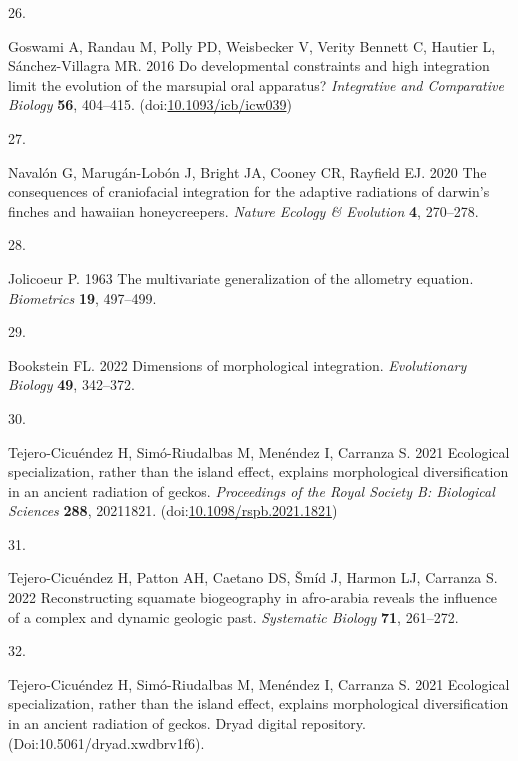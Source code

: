 \documentclass[
  11pt,
]{article}
\newlength{\cslhangindent}
\newlength{\csllabelwidth}
\newlength{\cslentryspacingunit} %
\newenvironment{CSLReferences}[2] %
 {%
  \setlength{\parindent}{0pt}
  \ifodd #1
  \let\oldpar\par
  \def\par{\hangindent=\cslhangindent\oldpar}
  \fi
  \setlength{\parskip}{#2\cslentryspacingunit}
 }%
 {}
\newcommand{\CSLLeftMargin}[1]{\parbox[t]{\csllabelwidth}{#1}}
\newcommand{\CSLRightInline}[1]{\parbox[t]{\linewidth - \csllabelwidth}{#1}\break}
\begin{document}
\begin{CSLReferences}{0}{0}
\leavevmode{}%
\CSLLeftMargin{26. }%
\CSLRightInline{Goswami A, Randau M, Polly PD, Weisbecker V, Verity
Bennett C, Hautier L, Sánchez-Villagra MR. 2016 Do developmental
constraints and high integration limit the evolution of the marsupial
oral apparatus? \emph{Integrative and Comparative Biology} \textbf{56},
404--415.
(doi:\href{https://doi.org/10.1093/icb/icw039}{10.1093/icb/icw039})}

\leavevmode{}%
\CSLLeftMargin{27. }%
\CSLRightInline{Navalón G, Marugán-Lobón J, Bright JA, Cooney CR,
Rayfield EJ. 2020 The consequences of craniofacial integration for the
adaptive radiations of darwin's finches and hawaiian honeycreepers.
\emph{Nature Ecology \& Evolution} \textbf{4}, 270--278.}

\leavevmode{}%
\CSLLeftMargin{28. }%
\CSLRightInline{Jolicoeur P. 1963 The multivariate generalization of the
allometry equation. \emph{Biometrics} \textbf{19}, 497--499.}

\leavevmode{}%
\CSLLeftMargin{29. }%
\CSLRightInline{Bookstein FL. 2022 Dimensions of morphological
integration. \emph{Evolutionary Biology} \textbf{49}, 342--372.}

\leavevmode{}%
\CSLLeftMargin{30. }%
\CSLRightInline{Tejero-Cicuéndez H, Simó-Riudalbas M, Menéndez I,
Carranza S. 2021 Ecological specialization, rather than the island
effect, explains morphological diversification in an ancient radiation
of geckos. \emph{Proceedings of the Royal Society B: Biological
Sciences} \textbf{288}, 20211821.
(doi:\href{https://doi.org/10.1098/rspb.2021.1821}{10.1098/rspb.2021.1821})}

\leavevmode{}%
\CSLLeftMargin{31. }%
\CSLRightInline{Tejero-Cicuéndez H, Patton AH, Caetano DS, Šmíd J,
Harmon LJ, Carranza S. 2022 Reconstructing squamate biogeography in
afro-arabia reveals the influence of a complex and dynamic geologic
past. \emph{Systematic Biology} \textbf{71}, 261--272.}

\leavevmode{}%
\CSLLeftMargin{32. }%
\CSLRightInline{Tejero-Cicuéndez H, Simó-Riudalbas M, Menéndez I,
Carranza S. 2021 Ecological specialization, rather than the island
effect, explains morphological diversification in an ancient radiation
of geckos. Dryad digital repository. (Doi:10.5061/dryad.xwdbrv1f6). }


\end{CSLReferences}
\end{document}
